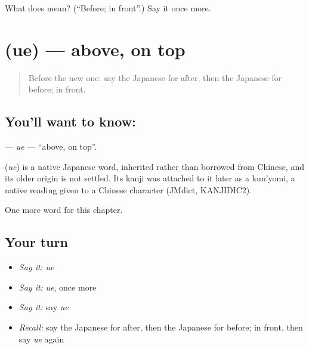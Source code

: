 \begin{tcolorbox}[breakable,colback=teal!4,colframe=teal!35!black,title={Before you move on}]
What does  mean? (\textquotedblleft{}Before; in front\textquotedblright{}.) Say it once more.
\end{tcolorbox}
\section[\texorpdfstring{\ja{うえ} (ue)}{うえ (ue)}]{ (ue) — above, on top}

\label{lesson:JA-C56-ue}



\begin{quote}
Before the new one: say the Japanese for after, then the Japanese for before; in front.
\end{quote}

\subsection*{You'll want to know: }
\textbf{} — \emph{ue} — \textquotedblleft{}above, on top\textquotedblright{}.

\begin{cousinweb}
\textbf{} (\emph{ue}) is a native Japanese word, inherited rather than borrowed from Chinese, and its older origin is not settled. Its kanji was attached to it later as a kun'yomi, a native reading given to a Chinese character (JMdict, KANJIDIC2).
\end{cousinweb}

\begin{grammarlens}[title={What you've built}]
One more word for this chapter.
\end{grammarlens}

\subsection*{Your turn}
\begin{itemize}
\raggedright
  \item \emph{Say it:} \emph{ue}
  \item \emph{Say it:} \emph{ue}, once more
  \item \emph{Say it:} say \emph{ue}
  \item \emph{Recall:} say the Japanese for after, then the Japanese for before; in front, then say \emph{ue} again
\end{itemize}

